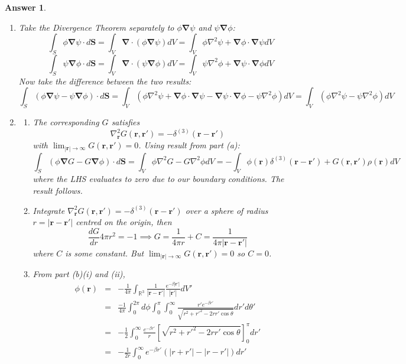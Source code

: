 \documentclass[a4paper]{article}
\newtheorem{ans}{Answer}[section]
\theoremstyle{new}
\begin{document}
\begin{ans}\leavevmode
\begin{enumerate}[label=(\alph*)]
\item Take the Divergence Theorem separately to $\phi\boldsymbol{\nabla}\psi$ and $\psi\boldsymbol{\nabla}\phi$:
$$\int_S\phi\boldsymbol{\nabla}\psi\cdot d\mathbf{S}=\int_V\boldsymbol{\nabla}\cdot(\phi\boldsymbol{\nabla}\psi)dV=\int_V\phi\nabla^2\psi+\boldsymbol{\nabla}\phi\cdot\boldsymbol{\nabla}\psi dV$$
$$\int_S\psi\boldsymbol{\nabla}\phi\cdot d\mathbf{S}=\int_V\boldsymbol{\nabla}\cdot(\psi\boldsymbol{\nabla}\phi)dV=\int_V\psi\nabla^2\phi+\boldsymbol{\nabla}\psi\cdot\boldsymbol{\nabla}\phi dV$$
Now take the difference between the two results:
$$\int_S(\phi\boldsymbol{\nabla}\psi-\psi\boldsymbol{\nabla}\phi)\cdot d\mathbf{S}=\int_V(\phi\nabla^2\psi+\boldsymbol{\nabla}\phi\cdot \boldsymbol{\nabla}\psi-\boldsymbol{\nabla}\psi\cdot\boldsymbol{\nabla}\phi-\psi\nabla^2\phi)dV=\int_V(\phi\nabla^2\psi-\psi\nabla^2\phi)dV$$
\item
\begin{enumerate}[label=(\roman*)]
\item The corresponding $G$ satisfies
$$\nabla_{\mathbf{r}}^2G(\mathbf{r},\mathbf{r'})=-\delta^{(3)}(\mathbf{r}-\mathbf{r'})$$
with $\lim_{|\mathbf{r}|\rightarrow\infty}G(\mathbf{r},\mathbf{r'})=0$. Using result from part (a):
$$\int_S(\phi\boldsymbol{\nabla} G-G\boldsymbol{\nabla}\phi)\cdot d\mathbf{S}=\int_V\phi\nabla^2G-G\nabla^2\phi dV=-\int_V\phi(\mathbf{r})\delta^{(3)}(\mathbf{r}-\mathbf{r'})+G(\mathbf{r},\mathbf{r'})\rho(\mathbf{r})dV$$
where the LHS evaluates to zero due to our boundary conditions. The result follows.
\item Integrate $\nabla_{\mathbf{r}}^2G(\mathbf{r},\mathbf{r'})=-\delta^{(3)}(\mathbf{r}-\mathbf{r'})$ over a sphere of radius $r=|\mathbf{r}-\mathbf{r'}|$ centred on the origin, then
$$\frac{dG}{dr}4\pi r^2=-1\implies G=\frac{1}{4\pi r}+C=\frac{1}{4\pi |\mathbf{r}-\mathbf{r'}|}$$
where $C$ is some constant. But $\lim_{|\mathbf{r}|\rightarrow\infty}G(\mathbf{r},\mathbf{r'})=0$ so $C=0$.
\item From part (b)(i) and (ii), 
\begin{eqnarray}
\phi(\mathbf{r})&=&-\frac{1}{4\pi}\int_{\mathbb{R}^3}\frac{1}{|\mathbf{r}-\mathbf{r'}|}\frac{e^{-\beta|\mathbf{r'}|}}{|\mathbf{r'}|}dV'\nonumber\\&=&\frac{-1}{4\pi}\int_0^{2\pi}d\phi\int_0^\pi\int_0^\infty\frac{r'e^{-\beta r'}}{\sqrt{r^2+r'^2-2rr'\cos\theta}}dr'd\theta'\nonumber\\&=&-\frac{1}{2}\int_0^\infty \frac{e^{-\beta r'}}{r}[\sqrt{r^2+r'^2-2rr'\cos\theta}]_0^\pi dr'\nonumber\\&=&-\frac{1}{2r}\int_0^\infty e^{-\beta r'}(|r+r'|-|r-r'|)dr'\nonumber

\end{eqnarray}
\end{enumerate}
\end{enumerate}
\end{ans}
\end{document}
